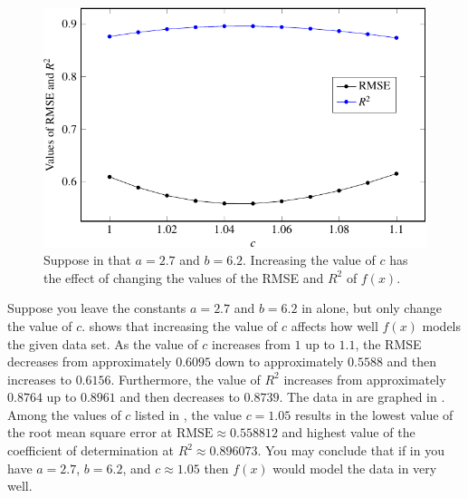 \documentclass[a4paper,oneside,12pt]{article}
\begin{document}
\begin{problem}
{\begin{solution}
\begin{table}[!htbp]
\centering

\caption{%
  Consider the function $f(x) = 2.7 \cos(cx) + 6.2$.  Increasing the
  value of $c$ has the effect of changing the values of the root mean
  square error~(RMSE) and the coefficient of determination of $f(x)$.
}
\label{tab:trigonometric:mean_daily_sunshine_vary_c}
\end{table}

\begin{figure}[!htbp]
\centering
\includegraphics[scale=1.1]{image/13/sunshine-vary-c.pdf}
\caption{%
  Suppose in  that
  $a = 2.7$ and $b = 6.2$.  Increasing the value of $c$ has the effect
  of changing the values of the RMSE and $R^2$ of $f(x)$.
}
\label{fig:trigonometric:mean_daily_sunshine_vary_c}
\end{figure}

Suppose you leave the constants $a = 2.7$ and $b = 6.2$ in
 alone, but only
change the value of $c$.
 shows that
increasing the value of $c$ affects how well $f(x)$ models the given
data set.  As the value of $c$ increases from $1$ up to $1.1$, the
RMSE decreases from approximately $0.6095$ down to approximately
$0.5588$ and then increases to $0.6156$.  Furthermore, the value of
$R^2$ increases from approximately $0.8764$ up to $0.8961$ and then
decreases to $0.8739$.  The data in
 are graphed in
.  Among the
values of $c$ listed in
, the value
$c = 1.05$ results in the lowest value of the root mean square error
at $\text{RMSE} \approx 0.558812$ and highest value of the coefficient
of determination at $R^2 \approx 0.896073$.  You may conclude that if
in  you have
$a = 2.7$, $b = 6.2$, and $c \approx 1.05$ then $f(x)$ would model the
data in  very well.


\end{solution}}
\end{problem}
\end{document}
